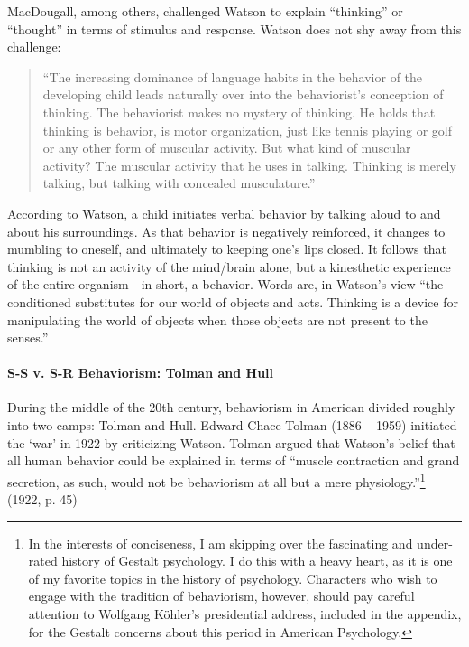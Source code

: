 MacDougall, among others, challenged Watson to explain “thinking” or “thought” in terms of stimulus and response. Watson does not shy away from this challenge:

\begin{quote}

“The increasing dominance of language habits in the behavior of the developing child leads naturally over into the behaviorist's conception of thinking. The behaviorist makes no mystery of thinking. He holds that thinking is behavior, is motor organization, just like tennis playing or golf or any other form of muscular activity. But what kind of muscular activity? The muscular activity that he uses in talking. Thinking is merely talking, but talking with concealed musculature.”
\end{quote}

According to Watson, a child initiates verbal behavior by talking aloud to and about his surroundings. As that behavior is negatively reinforced, it changes to mumbling to oneself, and ultimately to keeping one's lips closed. It follows that thinking is not an activity of the mind\slash brain alone, but a kinesthetic experience of the entire organism—in short, a behavior. Words are, in Watson's view “the conditioned substitutes for our world of objects and acts. Thinking is a device for manipulating the world of objects when those objects are not present to the senses.”

\paragraph{S-S v. S-R Behaviorism: Tolman and Hull}
\label{s-sv.s-rbehaviorism:tolmanandhull}

During the middle of the 20th century, behaviorism in American divided roughly into two camps: Tolman and Hull. Edward Chace Tolman (1886 – 1959) initiated the `war' in 1922 by criticizing Watson. Tolman argued that Watson's belief that all human behavior could be explained in terms of “muscle contraction and grand secretion, as such, would not be behaviorism at all but a mere physiology.”\footnote{In the interests of conciseness, I am skipping over the fascinating and under-rated history of Gestalt psychology. I do this with a heavy heart, as it is one of my favorite topics in the history of psychology. Characters who wish to engage with the tradition of behaviorism, however, should pay careful attention to Wolfgang Köhler's presidential address, included in the appendix, for the Gestalt concerns about this period in American Psychology.} (1922, p. 45)


